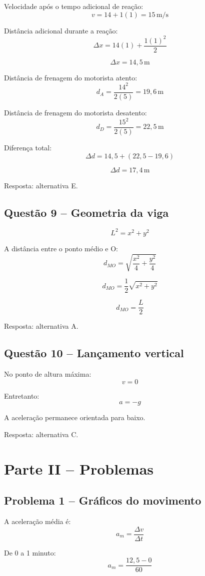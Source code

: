 \documentclass[12pt,a4paper]{article}
\begin{document}
Velocidade após o tempo adicional de reação:
\[
v=14+1(1)=15\,\mathrm{m/s}
\]

Distância adicional durante a reação:
\[
\Delta x=14(1)+\frac{1(1)^2}{2}
\]

\[
\Delta x=14,5\,\mathrm{m}
\]

Distância de frenagem do motorista atento:
\[
d_A=\frac{14^2}{2(5)}=19,6\,\mathrm{m}
\]

Distância de frenagem do motorista desatento:
\[
d_D=\frac{15^2}{2(5)}=22,5\,\mathrm{m}
\]

Diferença total:
\[
\Delta d=14,5+(22,5-19,6)
\]

\[
\boxed{\Delta d=17,4\,\mathrm{m}}
\]

Resposta: alternativa E.

\subsection{Questão 9 -- Geometria da viga}

\[
L^2=x^2+y^2
\]

A distância entre o ponto médio e O:
\[
d_{MO}=
\sqrt{\frac{x^2}{4}+\frac{y^2}{4}}
\]

\[
d_{MO}=\frac{1}{2}\sqrt{x^2+y^2}
\]

\[
\boxed{d_{MO}=\frac{L}{2}}
\]

Resposta: alternativa A.

\subsection{Questão 10 -- Lançamento vertical}

No ponto de altura máxima:
\[
v=0
\]

Entretanto:
\[
a=-g
\]

A aceleração permanece orientada para baixo.

Resposta: alternativa C.

\newpage
\section{Parte II -- Problemas}

\subsection{Problema 1 -- Gráficos do movimento}

A aceleração média é:
\[
a_m=\frac{\Delta v}{\Delta t}
\]

De 0 a 1 minuto:
\[
a_m=\frac{12,5-0}{60}
\]
\end{document}

